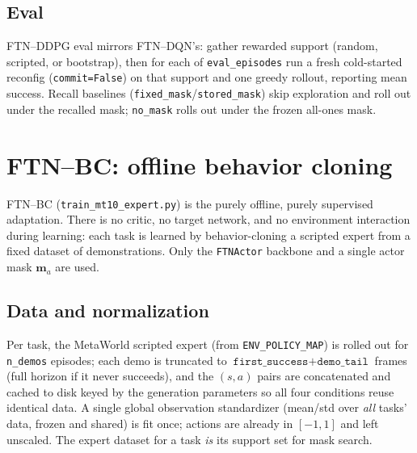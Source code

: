 \documentclass[11pt]{article}
\newcommand{\obs}{s}
\newcommand{\act}{a}
\newcommand{\mask}{\bm{m}}                 %
\newcommand{\code}[1]{\texttt{\small #1}}
\begin{document}
\subsection{Eval}
FTN--DDPG eval mirrors FTN--DQN's: gather rewarded support (random, scripted, or
bootstrap), then for each of \code{eval\_episodes} run a fresh cold-started
reconfig (\code{commit=False}) on that support and one greedy rollout, reporting
mean success. Recall baselines (\code{fixed\_mask}/\code{stored\_mask}) skip
exploration and roll out under the recalled mask; \code{no\_mask} rolls out under
the frozen all-ones mask.

\section{FTN--BC: offline behavior cloning}
\label{sec:bc}

FTN--BC (\code{train\_mt10\_expert.py}) is the purely offline, purely supervised
adaptation. There is no critic, no target network, and no environment interaction
during learning: each task is learned by behavior-cloning a scripted expert from a
fixed dataset of demonstrations. Only the \code{FTNActor} backbone and a single
actor mask $\mask_a$ are used.

\subsection{Data and normalization}
Per task, the MetaWorld scripted expert (from \code{ENV\_POLICY\_MAP}) is rolled
out for \code{n\_demos} episodes; each demo is truncated to
$\texttt{first\_success}+\texttt{demo\_tail}$ frames (full horizon if it never
succeeds), and the $(\obs,\act)$ pairs are concatenated and cached to disk keyed
by the generation parameters so all four conditions reuse identical data. A single
global observation standardizer (mean/std over \emph{all} tasks' data, frozen and
shared) is fit once; actions are already in $[-1,1]$ and left unscaled. The expert
dataset for a task \emph{is} its support set for mask search.
\end{document}
